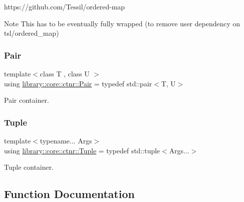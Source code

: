 https\+://github.com/\+Tessil/ordered-\/map \begin{DoxyNote}{Note}
This has to be eventually fully wrapped (to remove user dependency on tsl/ordered\+\_\+map) 
\end{DoxyNote}
\mbox{\label{namespacelibrary_1_1core_1_1ctnr_aad6f8de4c0f279c10436d59d4ace74bd}} 
\subsubsection{\texorpdfstring{Pair}{Pair}}
{\footnotesize\ttfamily template$<$class T , class U $>$ \\
using \hyperlink{namespacelibrary_1_1core_1_1ctnr_aad6f8de4c0f279c10436d59d4ace74bd}{library\+::core\+::ctnr\+::\+Pair} = typedef std\+::pair$<$T, U$>$}



Pair container. 

\mbox{\label{namespacelibrary_1_1core_1_1ctnr_a551ef72e2adb570c4d6bdf5e1bbc96b9}} 
\subsubsection{\texorpdfstring{Tuple}{Tuple}}
{\footnotesize\ttfamily template$<$typename... Args$>$ \\
using \hyperlink{namespacelibrary_1_1core_1_1ctnr_a551ef72e2adb570c4d6bdf5e1bbc96b9}{library\+::core\+::ctnr\+::\+Tuple} = typedef std\+::tuple$<$Args...$>$}



Tuple container. 



\subsection{Function Documentation}
\mbox{\label{namespacelibrary_1_1core_1_1ctnr_a96a0b941c0de59772cb5e073d0c2b8a8}} 
